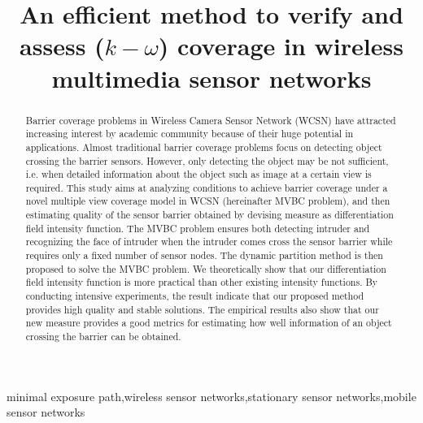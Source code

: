 \documentclass[3p]{elsarticle}
\begin{document}
\begin{frontmatter}

\title{An efficient method to verify and assess ($k-\omega$) coverage in wireless multimedia sensor networks}


\begin{abstract}
Barrier coverage problems in Wireless Camera Sensor Network (WCSN) have attracted increasing interest by academic community because of their huge potential in applications. Almost traditional barrier coverage problems focus on detecting object crossing the barrier sensors. However, only detecting the object may be not sufficient, i.e. when detailed information about the object such as image at a certain view is required. This study aims at analyzing conditions to achieve barrier coverage under a novel multiple view coverage model in WCSN (hereinafter MVBC problem), and then estimating quality of the sensor barrier obtained by devising measure as differentiation field intensity function. The MVBC problem ensures both detecting intruder and recognizing the face of intruder when the intruder comes cross the sensor barrier while requires only a fixed number of sensor nodes. The dynamic partition method is then proposed to solve the MVBC problem. We theoretically show that our differentiation field intensity function is more practical than other existing intensity functions. By conducting intensive experiments, the result indicate that our proposed method provides high quality and stable solutions. The empirical results also show that our new measure provides a good metrics for estimating how well information of an object crossing the barrier can be obtained.
\end{abstract}

\begin{keyword}
minimal exposure path\sep wireless sensor networks\sep stationary sensor networks\sep mobile sensor networks
\end{keyword}

\end{frontmatter}
\end{document}
